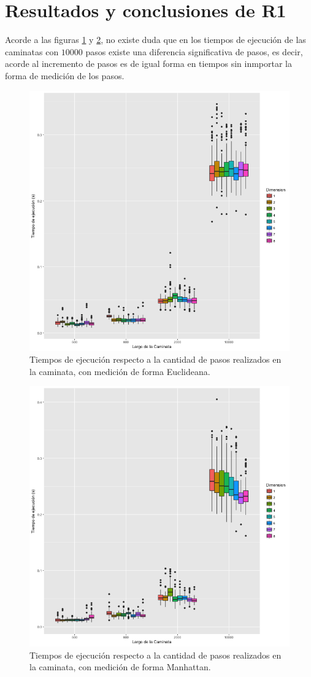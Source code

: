 \documentclass[a4paper]{article}
\begin{document}
\section{Resultados y conclusiones de R1}
Acorde a las figuras \ref{fig:LargoEu} y \ref{fig:LargoMa}, no existe duda que en los tiempos de ejecución de las caminatas con $10000$ pasos existe una diferencia significativa de pasos, es decir, acorde al incremento de pasos es de igual forma en tiempos sin inmportar la forma de medición de los pasos.
\begin{figure}[h]
\centering
\includegraphics[width=0.7\linewidth]{LargoEu}
\caption{Tiempos de ejecución respecto a la cantidad de pasos realizados en la caminata, con medición de forma Euclideana.}
\label{fig:LargoEu}
\end{figure}

\begin{figure}[h]
\centering
\includegraphics[width=0.7\linewidth]{LargoMa}
\caption{Tiempos de ejecución respecto a la cantidad de pasos realizados en la caminata, con medición de forma Manhattan.}
\label{fig:LargoMa}
\end{figure}
\end{document}
